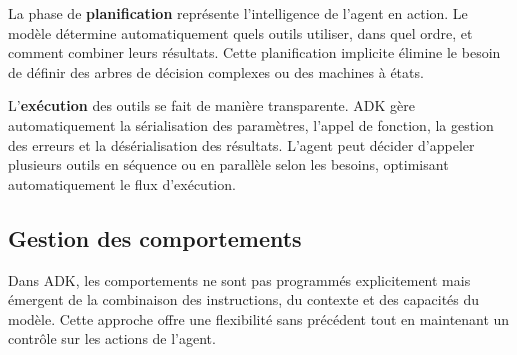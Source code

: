 La phase de \textbf{planification} représente l'intelligence de l'agent en action. Le modèle détermine automatiquement quels outils utiliser, dans quel ordre, et comment combiner leurs résultats. Cette planification implicite élimine le besoin de définir des arbres de décision complexes ou des machines à états.

L'\textbf{exécution} des outils se fait de manière transparente. ADK gère automatiquement la sérialisation des paramètres, l'appel de fonction, la gestion des erreurs et la désérialisation des résultats. L'agent peut décider d'appeler plusieurs outils en séquence ou en parallèle selon les besoins, optimisant automatiquement le flux d'exécution.

\subsection{Gestion des comportements}

Dans ADK, les comportements ne sont pas programmés explicitement mais émergent de la combinaison des instructions, du contexte et des capacités du modèle. Cette approche offre une flexibilité sans précédent tout en maintenant un contrôle sur les actions de l'agent.

